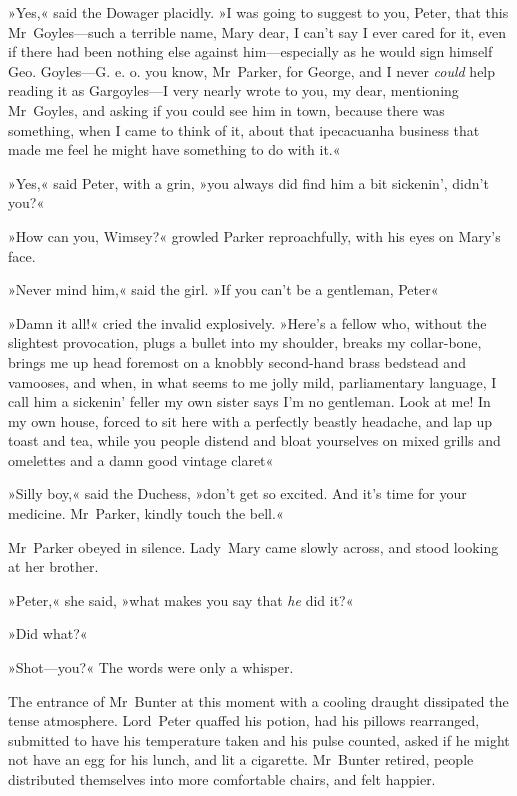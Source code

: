 »Yes,« said the Dowager placidly. »I was going to suggest to you, Peter, that this Mr~Goyles—such a terrible name, Mary dear, I can't say I ever cared for it, even if there had been nothing else against him—especially as he would sign himself Geo. Goyles—G\@. e. o. you know, Mr~Parker, for George, and I never \textit{could} help reading it as Gargoyles—I very nearly wrote to you, my dear, mentioning Mr~Goyles, and asking if you could see him in town, because there was something, when I came to think of it, about that ipecacuanha business that made me feel he might have something to do with it.«

»Yes,« said Peter, with a grin, »you always did find him a bit sickenin', didn't you?«

»How can you, Wimsey?« growled Parker reproachfully, with his eyes on Mary's face.

»Never mind him,« said the girl. »If you can't be a gentleman, Peter\longdash«

»Damn it all!« cried the invalid explosively. »Here's a fellow who, without the slightest provocation, plugs a bullet into my shoulder, breaks my collar-bone, brings me up head foremost on a knobbly second-hand brass bedstead and vamooses, and when, in what seems to me jolly mild, parliamentary language, I call him a sickenin' feller my own sister says I'm no gentleman. Look at me! In my own house, forced to sit here with a perfectly beastly headache, and lap up toast and tea, while you people distend and bloat yourselves on mixed grills and omelettes and a damn good vintage claret\longdash«

»Silly boy,« said the Duchess, »don't get so excited. And it's time for your medicine. Mr~Parker, kindly touch the bell.«

Mr~Parker obeyed in silence. Lady~Mary came slowly across, and stood looking at her brother.

»Peter,« she said, »what makes you say that \textit{he} did it?«

»Did what?«

»Shot—you?« The words were only a whisper.

The entrance of Mr~Bunter at this moment with a cooling draught dissipated the tense atmosphere. Lord~Peter quaffed his potion, had his pillows rearranged, submitted to have his temperature taken and his pulse counted, asked if he might not have an egg for his lunch, and lit a cigarette. Mr~Bunter retired, people distributed themselves into more comfortable chairs, and felt happier.

